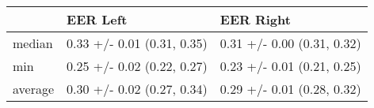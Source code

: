 \begin{tabular}{lll}
\toprule
{} &                    EER Left &                   EER Right \\
\midrule
median  &  0.33 +/- 0.01 (0.31, 0.35) &  0.31 +/- 0.00 (0.31, 0.32) \\
min     &  0.25 +/- 0.02 (0.22, 0.27) &  0.23 +/- 0.01 (0.21, 0.25) \\
average &  0.30 +/- 0.02 (0.27, 0.34) &  0.29 +/- 0.01 (0.28, 0.32) \\
\bottomrule
\end{tabular}
